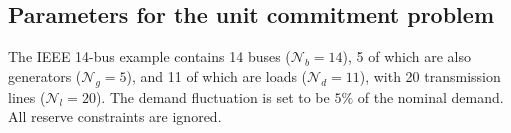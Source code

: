 \documentclass[12pt,x11names]{article}
\theoremstyle{definition}
\begin{document}
\begin{appendix}
\section{Parameters for the unit commitment problem}\label{appx:unitcom_parameters}

The IEEE 14-bus example contains 14 buses ($\mathcal{N}_b=14$), 5 of which are also generators ($\mathcal{N}_g=5$), and 11 of which are loads ($\mathcal{N}_d=11$), with 20 transmission lines ($\mathcal{N}_l=20$). The demand fluctuation is set to be $5\%$ of the nominal demand. All reserve constraints are ignored. %


\end{appendix}
\end{document}
